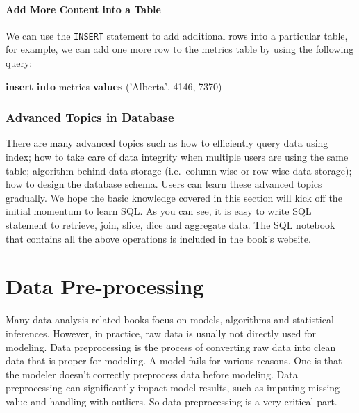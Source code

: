 \documentclass[12pt,]{krantz}
\makeatletter
\newenvironment{Shaded}{\begin{snugshade}}{\end{snugshade}}
\newcommand{\DecValTok}[1]{\textcolor[rgb]{0.06,0.06,0.06}{#1}}
\newcommand{\KeywordTok}[1]{\textcolor[rgb]{0.27,0.27,0.27}{\textbf{#1}}}
\newcommand{\NormalTok}[1]{#1}
\newcommand{\StringTok}[1]{\textcolor[rgb]{0.5,0.5,0.5}{#1}}
\newenvironment{kframe}{%
\medskip{}
\setlength{\fboxsep}{.8em}
 \def\at@end@of@kframe{}%
 \ifinner\ifhmode%
  \def\at@end@of@kframe{\end{minipage}}%
  \begin{minipage}{\columnwidth}%
 \fi\fi%
 \def\FrameCommand##1{\hskip\@totalleftmargin \hskip-\fboxsep
 \colorbox{shadecolor}{##1}\hskip-\fboxsep
     \hskip-\linewidth \hskip-\@totalleftmargin \hskip\columnwidth}%
 \MakeFramed {\advance\hsize-\width
   \@totalleftmargin\z@ \linewidth\hsize
   \@setminipage}}%
 {\par\unskip\endMakeFramed%
 \at@end@of@kframe}
\renewenvironment{Shaded}{\begin{kframe}}{\end{kframe}}
\makeatother
\begin{document}
\hypertarget{add-more-content-into-a-table}{%
\subsubsection{Add More Content into a Table}\label{add-more-content-into-a-table}}

We can use the \texttt{INSERT} statement to add additional rows into a particular table, for example, we can add one more row to the metrics table by using the following query:

\begin{Shaded}
\begin{Highlighting}[]
\KeywordTok{insert} \KeywordTok{into}\NormalTok{ metrics}
\KeywordTok{values}\NormalTok{ (}\StringTok{'Alberta'}\NormalTok{, }\DecValTok{4146}\NormalTok{, }\DecValTok{7370}\NormalTok{)}
\end{Highlighting}
\end{Shaded}

\hypertarget{advanced-topics-in-database}{%
\subsection{Advanced Topics in Database}\label{advanced-topics-in-database}}

There are many advanced topics such as how to efficiently query data using index; how to take care of data integrity when multiple users are using the same table; algorithm behind data storage (i.e.~column-wise or row-wise data storage); how to design the database schema. Users can learn these advanced topics gradually. We hope the basic knowledge covered in this section will kick off the initial momentum to learn SQL. As you can see, it is easy to write SQL statement to retrieve, join, slice, dice and aggregate data. The SQL notebook that contains all the above operations is included in the book's website.

\hypertarget{data-pre-processing}{%
\chapter{Data Pre-processing}\label{data-pre-processing}}

Many data analysis related books focus on models, algorithms and statistical inferences. However, in practice, raw data is usually not directly used for modeling. Data preprocessing is the process of converting raw data into clean data that is proper for modeling. A model fails for various reasons. One is that the modeler doesn't correctly preprocess data before modeling. Data preprocessing can significantly impact model results, such as imputing missing value and handling with outliers. So data preprocessing is a very critical part.
\end{document}

